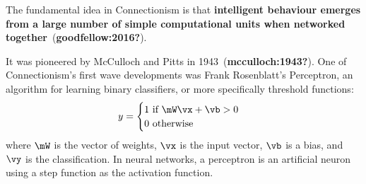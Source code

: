 \documentclass[
  letterpaper,
  DIV=11,
  numbers=noendperiod,
  oneside]{scrreprt}
\begin{document}
The fundamental idea in Connectionism is that \textbf{intelligent
behaviour emerges from a large number of simple computational units when
networked together}~(\textbf{goodfellow:2016?}).

It was pioneered by McCulloch and Pitts in
1943~(\textbf{mcculloch:1943?}). One of Connectionism's first wave
developments was Frank Rosenblatt's Perceptron, an algorithm for
learning binary classifiers, or more specifically threshold functions:
\[\begin{aligned}
    y=
    \begin{cases}
        1 \text{ if } \mW\vx + \vb > 0\\
        0 \text{ otherwise }
    \end{cases}
\end{aligned}\] where \(\mW\) is the vector of weights, \(\vx\) is the
input vector, \(\vb\) is a bias, and \(\vy\) is the classification. In
neural networks, a perceptron is an artificial neuron using a step
function as the activation function.
\end{document}
